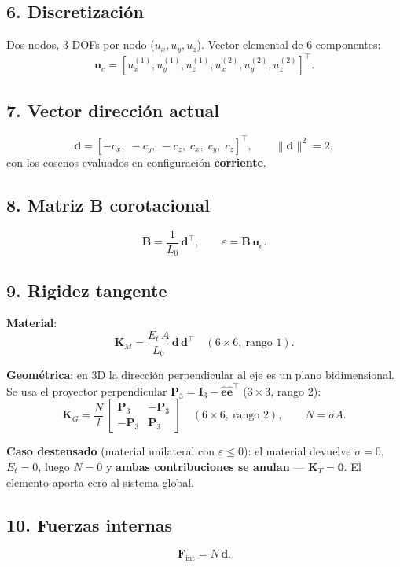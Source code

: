 \documentclass[11pt,letterpaper,oneside]{report}
\begin{document}
\subsection{6. Discretización}
Dos nodos, 3 DOFs por nodo ($u_x, u_y, u_z$). Vector elemental de 6 componentes:
\[
\mathbf u_e = [u_x^{(1)}, u_y^{(1)}, u_z^{(1)}, u_x^{(2)}, u_y^{(2)}, u_z^{(2)}]^\top.
\]

\subsection{7. Vector dirección actual}
\[
\mathbf d = [-c_x,\; -c_y,\; -c_z,\; c_x,\; c_y,\; c_z]^\top, \qquad \|\mathbf d\|^2 = 2,
\]
con los cosenos evaluados en configuración \textbf{corriente}.

\subsection{8. Matriz B corotacional}
\[
\mathbf B = \frac{1}{L_0}\,\mathbf d^\top, \qquad \varepsilon = \mathbf B\,\mathbf u_e.
\]

\subsection{9. Rigidez tangente}
\textbf{Material}:
\[
\mathbf K_M = \frac{E_t\,A}{L_0}\,\mathbf d\,\mathbf d^\top \quad (6\times 6,\ \text{rango 1}).
\]

\textbf{Geométrica}: en 3D la dirección perpendicular al eje es un plano bidimensional. Se usa el proyector perpendicular $\mathbf P_3 = \mathbf I_3 - \hat{\mathbf e}\hat{\mathbf e}^\top$ ($3\times 3$, rango 2):
\[
\mathbf K_G = \frac{N}{l}\,\begin{bmatrix}\mathbf P_3 & -\mathbf P_3 \\ -\mathbf P_3 & \mathbf P_3\end{bmatrix} \quad (6\times 6,\ \text{rango 2}), \qquad N = \sigma A.
\]

\textbf{Caso destensado} (material unilateral con $\varepsilon \leq 0$): el material devuelve $\sigma = 0$, $E_t = 0$, luego $N = 0$ y \textbf{ambas contribuciones se anulan} --- $\mathbf K_T = \mathbf 0$. El elemento aporta cero al sistema global.

\subsection{10. Fuerzas internas}
\[
\mathbf F_{\text{int}} = N\,\mathbf d.
\]
\end{document}
